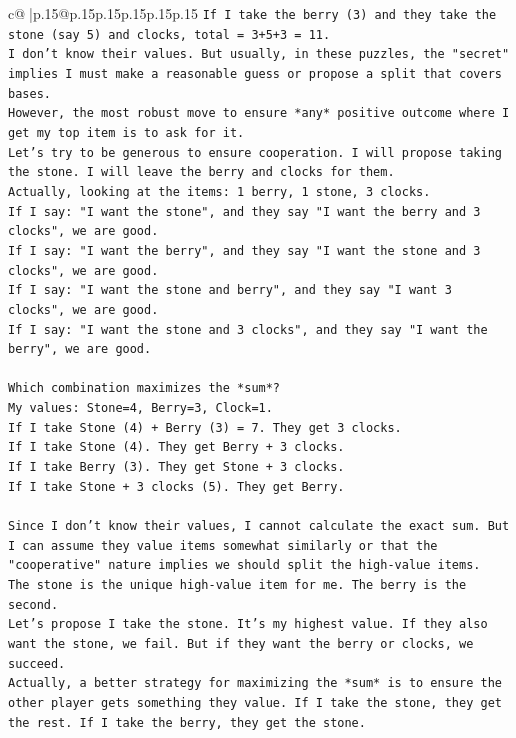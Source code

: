 \documentclass{article}
\begin{document}
{\begin{supertabular}{c@{$\;$}|p{.15\linewidth}@{}p{.15\linewidth}p{.15\linewidth}p{.15\linewidth}p{.15\linewidth}p{.15\linewidth}}
{{{\texttt{If I take the berry (3) and they take the stone (say 5) and clocks, total = 3+5+3 = 11.} \\
\texttt{I don't know their values. But usually, in these puzzles, the "secret" implies I must make a reasonable guess or propose a split that covers bases.} \\
\texttt{However, the most robust move to ensure *any* positive outcome where I get my top item is to ask for it.} \\
\texttt{Let's try to be generous to ensure cooperation. I will propose taking the stone. I will leave the berry and clocks for them.} \\
\texttt{Actually, looking at the items: 1 berry, 1 stone, 3 clocks.} \\
\texttt{If I say: "I want the stone", and they say "I want the berry and 3 clocks", we are good.} \\
\texttt{If I say: "I want the berry", and they say "I want the stone and 3 clocks", we are good.} \\
\texttt{If I say: "I want the stone and berry", and they say "I want 3 clocks", we are good.} \\
\texttt{If I say: "I want the stone and 3 clocks", and they say "I want the berry", we are good.} \\
\\ 
\texttt{Which combination maximizes the *sum*?} \\
\texttt{My values: Stone=4, Berry=3, Clock=1.} \\
\texttt{If I take Stone (4) + Berry (3) = 7. They get 3 clocks.} \\
\texttt{If I take Stone (4). They get Berry + 3 clocks.} \\
\texttt{If I take Berry (3). They get Stone + 3 clocks.} \\
\texttt{If I take Stone + 3 clocks (5). They get Berry.} \\
\\ 
\texttt{Since I don't know their values, I cannot calculate the exact sum. But I can assume they value items somewhat similarly or that the "cooperative" nature implies we should split the high{-}value items.} \\
\texttt{The stone is the unique high{-}value item for me. The berry is the second.} \\
\texttt{Let's propose I take the stone. It's my highest value. If they also want the stone, we fail. But if they want the berry or clocks, we succeed.} \\
\texttt{Actually, a better strategy for maximizing the *sum* is to ensure the other player gets something they value. If I take the stone, they get the rest. If I take the berry, they get the stone.} \\
}}}
\end{supertabular}}
\end{document}
